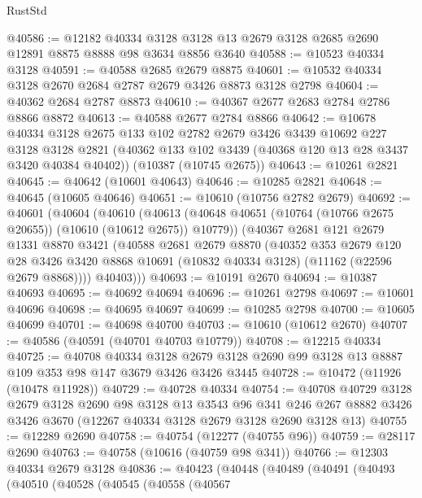 \begin{lexlean}{RustStd}
\begin{coremodule}
@40586 := @12182
    @40334
    @3128
    @3128
    @13
    @2679
    @3128
    @2685
    @2690
    @12891
    @8875
    @8888
    @98
    @3634
    @8856
    @3640
@40588 := @10523 @40334 @3128
@40591 := @40588 @2685 @2679 @8875
@40601 := @10532 @40334 @3128 @2670 @2684 @2787 @2679 @3426 @8873 @3128 @2798
@40604 := @40362 @2684 @2787 @8873
@40610 := @40367 @2677 @2683 @2784 @2786 @8866 @8872
@40613 := @40588 @2677 @2784 @8866
@40642 := @10678
    @40334
    @3128
    @2675
    @133
    @102
    @2782
    @2679
    @3426
    @3439
    @10692
    @227
    @3128
    @3128
    @2821
    (@40362 @133 @102 @3439 (@40368 @120 @13 @28 @3437 @3420 @40384 @40402))
    (@10387 (@10745 @2675))
@40643 := @10261 @2821
@40645 := @40642 (@10601 @40643)
@40646 := @10285 @2821
@40648 := @40645 (@10605 @40646)
@40651 := @10610 (@10756 @2782 @2679)
@40692 := @40601
    (@40604
      (@40610
        (@40613 (@40648 @40651 (@10764 (@10766 @2675 @20655)) (@10610 (@10612 @2675)) @10779))
        (@40367
          @2681
          @121
          @2679
          @1331
          @8870
          @3421
          (@40588
            @2681
            @2679
            @8870
            (@40352
              @353
              @2679
              @120
              @28
              @3426
              @3420
              @8868
              @10691
              (@10832 @40334 @3128)
              (@11162 (@22596 @2679 @8868))))
          @40403)))
@40693 := @10191 @2670
@40694 := @10387 @40693
@40695 := @40692 @40694
@40696 := @10261 @2798
@40697 := @10601 @40696
@40698 := @40695 @40697
@40699 := @10285 @2798
@40700 := @10605 @40699
@40701 := @40698 @40700
@40703 := @10610 (@10612 @2670)
@40707 := @40586 (@40591 (@40701 @40703 @10779))
@40708 := @12215 @40334
@40725 := @40708
    @40334
    @3128
    @2679
    @3128
    @2690
    @99
    @3128
    @13
    @8887
    @109
    @353
    @98
    @147
    @3679
    @3426
    @3426
    @3445
@40728 := @10472 (@11926 (@10478 @11928))
@40729 := @40728 @40334
@40754 := @40708
    @40729
    @3128
    @2679
    @3128
    @2690
    @98
    @3128
    @13
    @3543
    @96
    @341
    @246
    @267
    @8882
    @3426
    @3426
    @3670
    (@12267 @40334 @3128 @2679 @3128 @2690 @3128 @13)
@40755 := @12289 @2690
@40758 := @40754 (@12277 (@40755 @96))
@40759 := @28117 @2690
@40763 := @40758 (@10616 (@40759 @98 @341))
@40766 := @12303 @40334 @2679 @3128
@40836 := @40423
    (@40448
      (@40489
        (@40491
          (@40493
            (@40510
              (@40528
                (@40545
                  (@40558
                    (@40567

\end{coremodule}
\end{lexlean}
